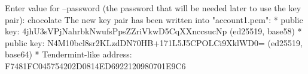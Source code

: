 \begin{shellbox}\begin{ttlst}
Enter value for --password (the password that will be needed later to use the key pair): chocolate
The new key pair has been written into "account1.pem":
* public key: 4jhU3sVPjNahrbkNwufsPpsZZriVkwD5CqXXnccsucNp (ed25519, base58)
* public key: N4M10bcl8sr2KLzdDN70HB+171L5J5CPOLCi9XklWD0= (ed25519, base64)
* Tendermint-like address: F7481FC045754202D0814ED6922120980701E9C6
\end{ttlst}\end{shellbox}
